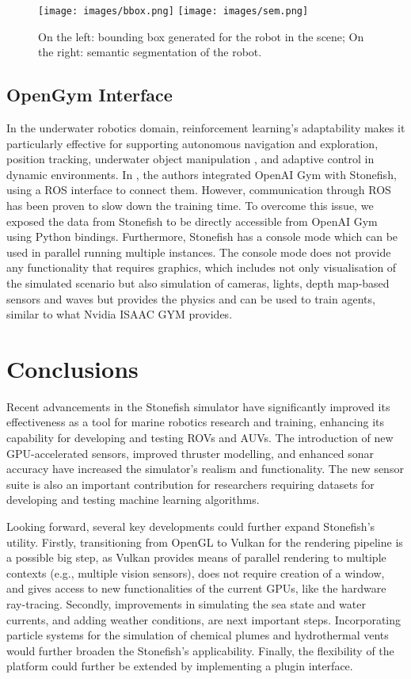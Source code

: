 \begin{figure}[t]
    \centering
    \texttt{[image: images/bbox.png]}
    \texttt{[image: images/sem.png]}
    \caption{On the left: bounding box generated for the robot in the scene; On the right: semantic segmentation of the robot.}
    \label{fig:segment}
\end{figure}

\subsection{OpenGym Interface}
In the underwater robotics domain, reinforcement learning's adaptability makes it particularly effective for supporting autonomous navigation and exploration, position tracking, underwater object manipulation \cite{9389378}, and adaptive control in dynamic environments. In \cite{urobench}, the authors integrated OpenAI Gym \cite{brockman2016openai} with Stonefish, using a ROS interface to connect them. However, communication through ROS has been proven to slow down the training time. To overcome this issue, we exposed the data from Stonefish to be directly accessible from OpenAI Gym using Python bindings.
Furthermore, Stonefish has a console mode which can be used in parallel running multiple instances. The console mode does not provide any functionality that requires graphics, which includes not only visualisation of the simulated scenario but also simulation of cameras, lights, depth map-based sensors and waves but provides the physics and can be used to train agents, similar to what Nvidia ISAAC GYM \cite{liang2018gpu} provides.

\section{Conclusions}
Recent advancements in the Stonefish simulator have significantly improved its effectiveness as a tool for marine robotics research and training, enhancing its capability for developing and testing ROVs and AUVs. The introduction of new GPU-accelerated sensors, improved thruster modelling, and enhanced sonar accuracy have increased the simulator's realism and functionality. The new sensor suite is also an important contribution for researchers requiring datasets for developing and testing machine learning algorithms.

Looking forward, several key developments could further expand Stonefish's utility. Firstly, transitioning from OpenGL to Vulkan for the rendering pipeline is a possible big step, as Vulkan provides means of parallel rendering to multiple contexts (e.g., multiple vision sensors), does not require creation of a window, and gives access to new functionalities of the current GPUs, like the hardware ray-tracing. Secondly, improvements in simulating the sea state and water currents, and adding weather conditions, are next important steps. Incorporating particle systems for the simulation of chemical plumes and hydrothermal vents would further broaden the Stonefish's applicability. Finally, the flexibility of the platform could further be extended by implementing a plugin interface.

